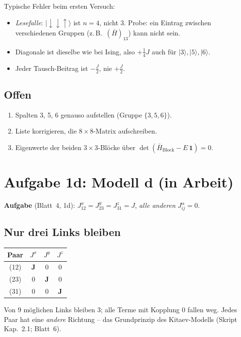 \documentclass[11pt,a4paper]{article}
\newcommand{\ket}[1]{\lvert #1\rangle}
\newcommand{\up}{{\uparrow}}
\newcommand{\dn}{{\downarrow}}
\newcommand{\Hbar}{\bar H}
\begin{document}
\begin{falle}
Typische Fehler beim ersten Versuch:
\begin{itemize}[leftmargin=*,itemsep=1pt]
\item \emph{Lesefalle}: $\ket{\dn\dn\up}$ ist $n=4$, nicht $3$. Probe: ein Eintrag zwischen verschiedenen Gruppen (z.\,B.\ $(\Hbar)_{13}$) kann nicht sein.
\item Diagonale ist dieselbe wie bei Ising, also $+\tfrac14J$ auch für $\ket3,\ket5,\ket6$.
\item Jeder Tausch-Beitrag ist $-\tfrac J2$, nie $+\tfrac J2$.
\end{itemize}
\end{falle}

\subsection{Offen}
\begin{enumerate}[itemsep=1pt]
\item Spalten 3, 5, 6 genauso aufstellen (Gruppe $\{3,5,6\}$).
\item Liste korrigieren, die $8\times8$-Matrix aufschreiben.
\item Eigenwerte der beiden $3\times3$-Blöcke über $\det(\Hbar_\text{Block} - E\,\mathbf 1) = 0$.
\end{enumerate}

\section{Aufgabe 1d: Modell d (in Arbeit)}

\textbf{Aufgabe} (Blatt~4, 1d): $J^x_{12} = J^y_{23} = J^z_{31} = J$, \emph{alle anderen} $J^\alpha_{ij} = 0$.

\subsection{Nur drei Links bleiben}

\begin{center}
\begin{tabular}{@{}cccc@{}}
\toprule
Paar & $J^x$ & $J^y$ & $J^z$\\
\midrule
(12) & $\boldsymbol J$ & 0 & 0\\
(23) & 0 & $\boldsymbol J$ & 0\\
(31) & 0 & 0 & $\boldsymbol J$\\
\bottomrule
\end{tabular}
\end{center}
Von 9 möglichen Links bleiben 3; alle Terme mit Kopplung 0 fallen weg. Jedes Paar hat eine \emph{andere} Richtung -- das Grundprinzip des Kitaev-Modells (Skript Kap.~2.1; Blatt~6).
\end{document}
